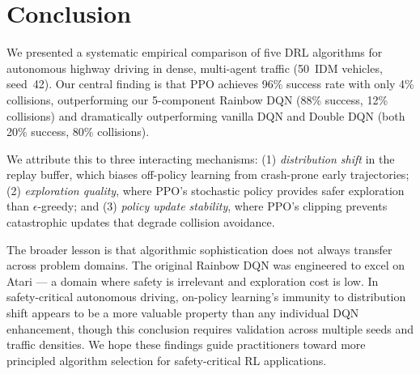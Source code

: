 \documentclass[conference]{IEEEtran}
\begin{document}
\section{Conclusion}

We presented a systematic empirical comparison of five DRL algorithms for autonomous
highway driving in dense, multi-agent traffic (50~IDM vehicles, seed~42).
Our central finding is that PPO
achieves 96\% success rate with only 4\% collisions, outperforming our 5-component
Rainbow DQN (88\% success, 12\% collisions) and dramatically outperforming vanilla
DQN and Double DQN (both 20\% success, 80\% collisions).

We attribute this to three interacting mechanisms: (1) \emph{distribution shift} in
the replay buffer, which biases off-policy learning from crash-prone early trajectories;
(2) \emph{exploration quality}, where PPO's stochastic policy provides safer exploration
than $\epsilon$-greedy; and (3) \emph{policy update stability}, where PPO's clipping
prevents catastrophic updates that degrade collision avoidance.

The broader lesson is that algorithmic sophistication does not always transfer across
problem domains. The original Rainbow DQN was engineered to excel on Atari — a domain
where safety is irrelevant and exploration cost is low. In safety-critical autonomous
driving, on-policy learning's immunity to distribution shift appears to be a more
valuable property than any individual DQN enhancement, though this conclusion
requires validation across multiple seeds and traffic densities.
We hope these findings guide practitioners toward more
principled algorithm selection for safety-critical RL applications.
\end{document}
